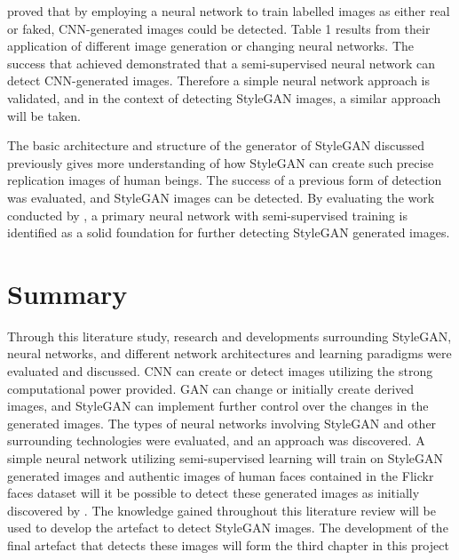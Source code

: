 \cite{Wang} proved that by employing a neural network to train labelled images as either real or faked, CNN-generated images could be detected. Table 1 results from their application of different image generation or changing neural networks. The success that \cite{Wang} achieved demonstrated that a semi-supervised neural network can detect CNN-generated images. Therefore a simple neural network approach is validated, and in the context of detecting StyleGAN images, a similar approach will be taken.

The basic architecture and structure of the generator of StyleGAN discussed previously gives more understanding of how StyleGAN can create such precise replication images of human beings. The success of a previous form of detection was evaluated, and StyleGAN images can be detected. By evaluating the work conducted by \cite{Wang}, a primary neural network with semi-supervised training is identified as a solid foundation for further detecting StyleGAN generated images.

\section{Summary}

Through this literature study, research and developments surrounding StyleGAN, neural networks, and different network architectures and learning paradigms were evaluated and discussed. CNN can create or detect images utilizing the strong computational power provided. GAN can change or initially create derived images, and StyleGAN can implement further control over the changes in the generated images. The types of neural networks involving StyleGAN and other surrounding technologies were evaluated, and an approach was discovered. A simple neural network utilizing semi-supervised learning will train on StyleGAN generated images and authentic images of human faces contained in the Flickr faces dataset will it be possible to detect these generated images as initially discovered by \citep{Wang}. The knowledge gained throughout this literature review will be used to develop the artefact to detect StyleGAN images. The development of the final artefact that detects these images will form the third chapter in this project